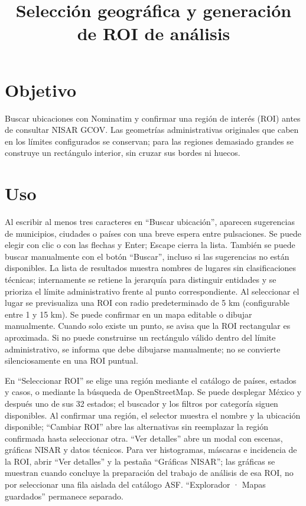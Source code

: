 \documentclass[11pt]{article}
\begin{document}
\title{Selección geográfica y generación de ROI de análisis}
\maketitle

\section{Objetivo}
Buscar ubicaciones con Nominatim y confirmar una región de interés (ROI) antes de consultar NISAR GCOV. Las geometrías administrativas originales que caben en los límites configurados se conservan; para las regiones demasiado grandes se construye un rectángulo interior, sin cruzar sus bordes ni huecos.

\section{Uso}
Al escribir al menos tres caracteres en ``Buscar ubicación'', aparecen sugerencias de municipios, ciudades o países con una breve espera entre pulsaciones. Se puede elegir con clic o con las flechas y Enter; Escape cierra la lista. También se puede buscar manualmente con el botón ``Buscar'', incluso si las sugerencias no están disponibles. La lista de resultados muestra nombres de lugares sin clasificaciones técnicas; internamente se retiene la jerarquía para distinguir entidades y se prioriza el límite administrativo frente al punto correspondiente. Al seleccionar el lugar se previsualiza una ROI con radio predeterminado de 5 km (configurable entre 1 y 15 km). Se puede confirmar en un mapa editable o dibujar manualmente. Cuando solo existe un punto, se avisa que la ROI rectangular es aproximada. Si no puede construirse un rectángulo válido dentro del límite administrativo, se informa que debe dibujarse manualmente; no se convierte silenciosamente en una ROI puntual.

En ``Seleccionar ROI'' se elige una región mediante el catálogo de países, estados y casos, o mediante la búsqueda de OpenStreetMap. Se puede desplegar México y después uno de sus 32 estados; el buscador y los filtros por categoría siguen disponibles. Al confirmar una región, el selector muestra el nombre y la ubicación disponible; ``Cambiar ROI'' abre las alternativas sin reemplazar la región confirmada hasta seleccionar otra. ``Ver detalles'' abre un modal con escenas, gráficas NISAR y datos técnicos. Para ver histogramas, máscaras e incidencia de la ROI, abrir ``Ver detalles'' y la pestaña ``Gráficas NISAR''; las gráficas se muestran cuando concluye la preparación del trabajo de análisis de esa ROI, no por seleccionar una fila aislada del catálogo ASF. ``Explorador · Mapas guardados'' permanece separado.
\end{document}
